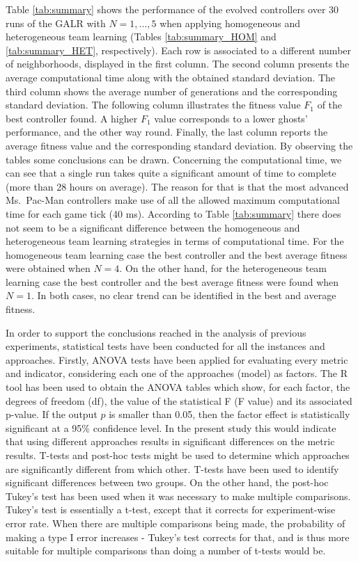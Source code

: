 \documentclass[journal]{IEEEtran}
\begin{document}
Table \ref{tab:summary} shows the performance of the evolved controllers over 30 runs of the GALR with $N=1,\ldots,5$ when applying homogeneous and heterogeneous team learning (Tables \ref{tab:summary_HOM} and \ref{tab:summary_HET}, respectively). Each row is associated to a different number of neighborhoods, displayed in the first column. The second column presents the average computational time along with the obtained standard deviation. The third column shows the average number of generations and the corresponding standard deviation. The following column illustrates the fitness value $F_1$ of the best controller found. A higher $F_1$ value corresponds to a lower ghosts' performance, and the other way round. Finally, the last column reports the average fitness value and the corresponding standard deviation. By observing the tables some conclusions can be drawn.
Concerning the computational time, we can see that a single run takes
quite a significant amount of time to complete (more than 28 hours
on average). The reason for that is that the most advanced
Ms.\  Pac-Man controllers make use of all the allowed maximum
computational time for each game tick (40 ms). According to Table \ref{tab:summary} there does not seem to be a significant difference between the homogeneous and heterogeneous team learning strategies in terms of computational time.
For the homogeneous team learning case the best controller and the best average fitness were obtained when $N=4$. On the other hand, for the heterogeneous team learning case the best controller and the best average fitness were found when $N=1$. In both cases, no clear trend can be identified in the best and average fitness. 

In order to support the conclusions reached in the analysis of previous experiments, statistical tests have been conducted for all the instances and approaches. Firstly, ANOVA tests \cite{Fisher25,Fisher36} have been applied for evaluating every metric and indicator, considering each one of the approaches (model) as factors. The R tool has been used to obtain the ANOVA tables which show, for each factor, the degrees of freedom (df), the value of the statistical F (F value) and its associated p-value. If the output $p$ is smaller than 0.05, then the factor effect is statistically significant at a 95\% confidence level. In the present study this would indicate that using different approaches results in significant differences on the metric results. T-tests and post-hoc tests might be used to determine which approaches are significantly different from which other. T-tests have been used to identify significant differences between two groups. On the other hand, the post-hoc Tukey's test \cite{Dickinson1971} has been used when it was necessary to make multiple comparisons. Tukey's test is essentially a t-test, except that it corrects for experiment-wise error rate. When there are multiple comparisons being made, the probability of making a type I error increases - Tukey's test corrects for that, and is thus more suitable for multiple comparisons than doing a number of t-tests would be.
\end{document}
